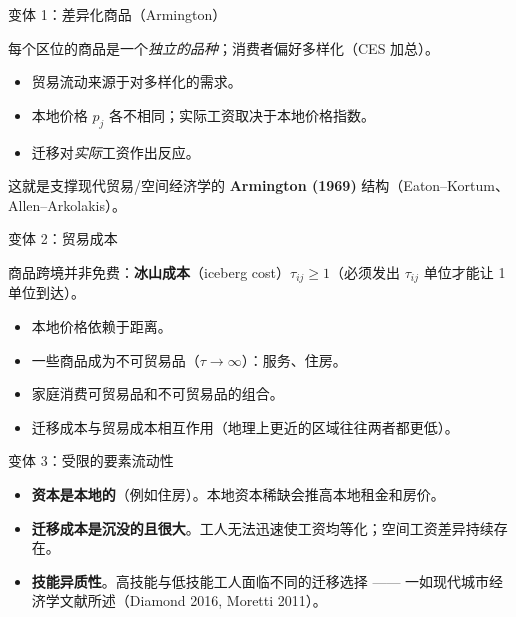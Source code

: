 \documentclass[10pt,aspectratio=169]{beamer}
\begin{document}
\begin{frame}{变体 1：差异化商品（Armington）}

每个区位的商品是一个\emph{独立的品种}；消费者偏好多样化（CES 加总）。

\vspace{0.4em}

\begin{itemize}
  \item 贸易流动来源于对多样化的需求。
  \item 本地价格 $p_j$ 各不相同；实际工资取决于本地价格指数。
  \item 迁移对\emph{实际}工资作出反应。
\end{itemize}

\vspace{0.3em}

这就是支撑现代贸易/空间经济学的 \textbf{Armington (1969)} 结构（Eaton--Kortum、Allen--Arkolakis）。

\end{frame}

\begin{frame}{变体 2：贸易成本}

商品跨境并非免费：\textbf{冰山成本}（iceberg cost）$\tau_{ij} \geq 1$（必须发出 $\tau_{ij}$ 单位才能让 1 单位到达）。

\vspace{0.4em}

\begin{itemize}
  \item 本地价格依赖于距离。
  \item 一些商品成为不可贸易品（$\tau \to \infty$）：服务、住房。
  \item 家庭消费可贸易品和不可贸易品的组合。
  \item 迁移成本与贸易成本相互作用（地理上更近的区域往往两者都更低）。
\end{itemize}

\end{frame}

\begin{frame}{变体 3：受限的要素流动性}

\begin{itemize}
  \item \textbf{资本是本地的}（例如住房）。本地资本稀缺会推高本地租金和房价。
  \item \textbf{迁移成本是沉没的且很大}。工人无法迅速使工资均等化；空间工资差异持续存在。
  \item \textbf{技能异质性}。高技能与低技能工人面临不同的迁移选择 —— 一如现代城市经济学文献所述（Diamond 2016, Moretti 2011）。
\end{itemize}

\end{frame}
\end{document}
